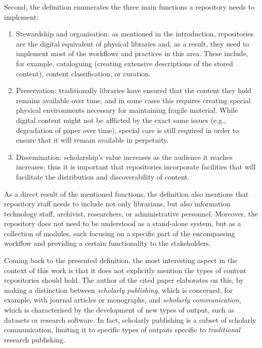 Second, the definition enumerates the three main functions a repository needs to implement:
\begin{enumerate}
    \item Stewardship and organisation: as mentioned in the introduction, repositories are the digital equivalent of physical libraries and, as a result, they need to implement most of the workflows and practices in this area. These include, for example, cataloguing (creating extensive descriptions of the stored content), content classification, or curation.
    \item Preservation: traditionally libraries have ensured that the content they hold remains available over time, and in some cases this requires creating special physical environments necessary for maintaining fragile material. While digital content might not be afflicted by the exact same issues (e.g., degradation of paper over time), special care is still required in order to ensure that it will remain available in perpetuity. 
    \item Dissemination: scholarship's value increases as the audience it reaches increases; thus it is important that repositories incorporate facilities that will facilitate the distribution and discoverability of content.
\end{enumerate}

As a direct result of the mentioned functions, the definition also mentions that repository staff needs to include not only librarians, but also information technology staff, archivist, researchers, or administrative personnel. Moreover, the repository does not need to be understood as a stand-alone system, but as a collection of modules, each focusing on a specific part of the encompassing workflow and providing a certain functionality to the stakeholders.

Coming back to the presented definition, the most interesting aspect in the context of this work is that it does not explicitly mention the types of content repositories should hold. The author of the cited paper elaborates on this, by making a distinction between \emph{scholarly publishing}, which is concerned, for example, with journal articles or monographs, and \emph{scholarly communication}, which is characterised by the development of new types of output, such as datasets or research software. In fact, scholarly publishing is a subset of scholarly communication, limiting it to specific types of outputs specific to \emph{traditional} research publishing.

